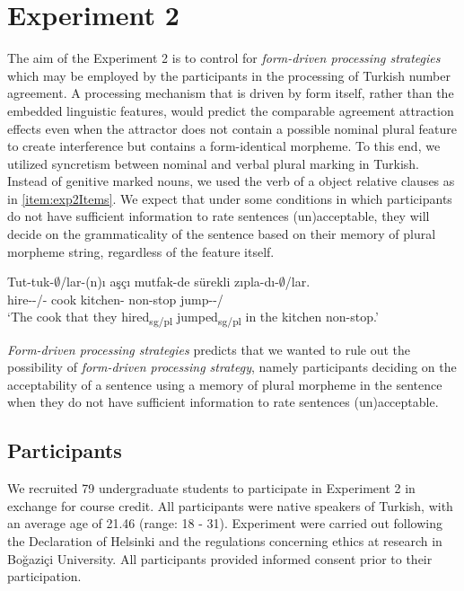 \documentclass[
  english,
  doc,floatsintext]{apa6}
\begin{document}
\hypertarget{experiment-2}{%
\section{Experiment 2}\label{experiment-2}}

The aim of the Experiment 2 is to control for \emph{form-driven processing strategies} which may be employed by the participants in the processing of Turkish number agreement. A processing mechanism that is driven by form itself, rather than the embedded linguistic features, would predict the comparable agreement attraction effects even when the attractor does not contain a possible nominal plural feature to create interference but contains a form-identical morpheme. To this end, we utilized syncretism between nominal and verbal plural marking in Turkish. Instead of genitive marked nouns, we used the verb of a object relative clauses as in \ref{item:exp2Items}. We expect that under some conditions in which participants do not have sufficient information to rate sentences (un)acceptable, they will decide on the grammaticality of the sentence based on their memory of plural morpheme string, regardless of the feature itself.

\begin{exe}
\ex \label{item:exp2Items}
\gll Tut-tuk-$\emptyset$/lar-(n)ı aşçı mutfak-de sürekli zıpla-dı-$\emptyset$/lar.\\
hire-\Nmlz{}-\Sg{}/\Pl{}-\Poss{} cook kitchen-\Loc{} non-stop jump-\Pst{}-\Sg{}/\Pl{}\\
\glt `The cook that they hired\textsubscript{sg/pl} jumped\textsubscript{sg/pl} in the kitchen non-stop.'
\end{exe}

\emph{Form-driven processing strategies} predicts that we wanted to rule out the possibility of \textit{form-driven processing strategy}, namely participants deciding on the acceptability of a sentence using a memory of plural morpheme in the sentence when they do not have sufficient information to rate sentences (un)acceptable.

\hypertarget{participants-1}{%
\subsection{Participants}\label{participants-1}}

We recruited 79 undergraduate students to participate in Experiment 2 in exchange for course credit. All participants were native speakers of Turkish, with an average age of 21.46 (range: 18 - 31).
Experiment were carried out following the Declaration of Helsinki and the regulations concerning ethics at research in Bo\u{g}azi\c{c}i University. All participants provided informed consent prior to their participation.
\end{document}
